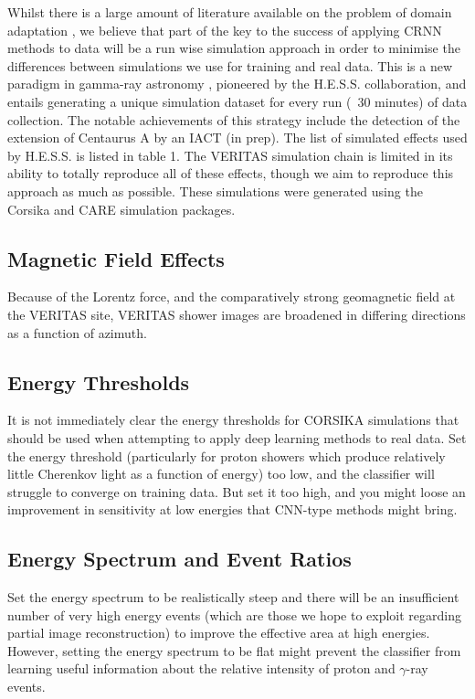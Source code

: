 


Whilst there is a large amount of literature available on the problem of domain adaptation \cite{ada}, we believe that part of the key to the success of applying CRNN methods to data will be a run wise simulation approach in order to minimise the differences between simulations we use for training and real data. This is a new paradigm in gamma-ray astronomy \cite{rws}, pioneered by the H.E.S.S. collaboration, and entails generating a unique simulation dataset for every run (~30 minutes) of data collection. The notable achievements of this strategy include the detection of the extension of Centaurus A by an IACT (in prep). The list of simulated effects used by H.E.S.S. is listed in table 1. The VERITAS simulation chain is limited in its ability to totally reproduce all of these effects, though we aim to reproduce this approach as much as possible. These simulations were generated using the Corsika and CARE simulation packages.
\subsection{Magnetic Field Effects}
Because of the Lorentz force, and the comparatively strong geomagnetic field at the VERITAS site, VERITAS shower images are broadened in differing directions as a function of azimuth. 
\subsection{Energy Thresholds}
It is not immediately clear the energy thresholds for CORSIKA simulations that should be used when attempting to apply deep learning methods to real data. Set the energy threshold (particularly for proton showers which produce relatively little Cherenkov light as a function of energy) too low, and the classifier will struggle to converge on training data. But set it too high, and you might loose an improvement in sensitivity at low energies that CNN-type methods might bring.

\subsection{Energy Spectrum and Event Ratios}
Set the energy spectrum to be realistically steep and there will be an insufficient number of very high energy events (which are those we hope to exploit regarding partial image reconstruction) to improve the effective area at high energies. However, setting the energy spectrum to be flat might prevent the classifier from learning useful information about the relative intensity of proton and $\gamma$-ray events.

